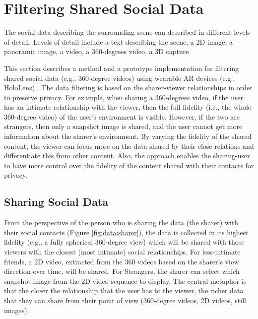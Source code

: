\section{Filtering Shared Social Data}
\label{sec:surrounding:360}

The social data describing the surrounding scene can described in different levels of detail. Levels of detail include a text describing the scene, a 2D image, a panoramic image, a video, a 360-degrees video, a 3D capture  

This section describes a method and a prototype implementation for filtering shared social data (e.g., 360-degree videos) using wearable AR devices (e.g., HoloLens) \cite{Nassani2018a}. The data filtering is based on the sharer-viewer relationships in order to preserve privacy. For example, when sharing a 360-degrees video, if the user has an intimate relationship with the viewer, then the full fidelity (i.e., the whole 360-degree video) of the user's environment is visible. However, if the two are strangers, then only a snapshot image is shared, and the user cannot get more information about the sharer's environment. By varying the fidelity of the shared content, the viewer can focus more on the data shared by their close relations and differentiate this from other content. Also, the approach enables the sharing-user to have more control over the fidelity of the content shared with their contacts for privacy.



\subsection{Sharing Social Data}

From the perspective of the person who is sharing the data (the sharer) with their social contacts (Figure \ref{fig:data:sharer}), the data is collected in its highest fidelity (e.g., a fully spherical 360-degree view) which will be shared with those viewers with the closest (most intimate) social relationships. For less-intimate friends, a 2D video, extracted from the 360 videos based on the sharer's view direction over time, will be shared. For Strangers, the sharer can select which snapshot image from the 2D video sequence to display. The central metaphor is that the closer the relationship that the user has to the viewer, the richer data that they can share from their point of view (360-degree videos, 2D videos, still images).


